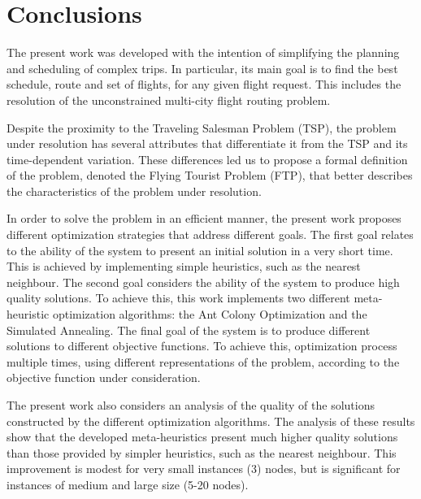 % 
% 
% 
% 
\section{Conclusions}

The present work was developed with the intention of simplifying the planning and scheduling of complex trips. In particular, its main goal is to find the best schedule, route and set of flights, for any given flight request. This includes the resolution of the unconstrained multi-city flight routing problem.

Despite the proximity to the Traveling Salesman Problem (TSP), the problem under resolution has several attributes that differentiate it from the TSP and its time-dependent variation. These differences led us to propose a formal definition of the problem, denoted the Flying Tourist Problem (FTP), that better describes the characteristics of the problem under resolution.

In order to solve the problem in an efficient manner, the present work proposes different optimization strategies that address different goals. The first goal relates to the ability of the system to present an initial solution in a very short time. This is achieved by implementing simple heuristics, such as the nearest neighbour. The second goal considers the ability of the system to produce high quality solutions. To achieve this, this work implements two different meta-heuristic optimization algorithms: the Ant Colony Optimization and the Simulated Annealing. The final goal of the system is to produce different solutions to different objective functions. To achieve this, optimization process multiple times, using different representations of the problem, according to the objective function under consideration.

The present work also considers an analysis of the quality of the solutions constructed by the different optimization algorithms. The analysis of these results show that the developed meta-heuristics present much higher quality solutions than those provided by simpler heuristics, such as the nearest neighbour. This improvement is modest for very small instances (3) nodes, but is significant for instances of medium and large size (5-20 nodes). 


